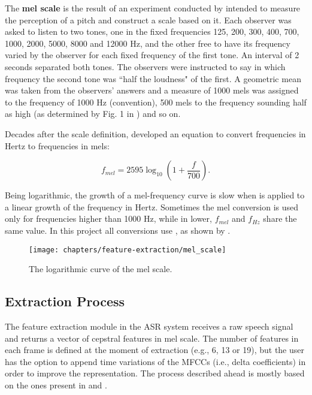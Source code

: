 The \textbf{mel scale} is the result of an experiment conducted by  intended to measure the perception of a pitch and construct a scale based on it. Each observer was asked to listen to two tones, one in the fixed frequencies 125, 200, 300, 400, 700, 1000, 2000, 5000, 8000 and 12000 Hz, and the other free to have its frequency varied by the observer for each fixed frequency of the first tone. An interval of 2 seconds separated both tones. The observers were instructed to say in which frequency the second tone was ``half the loudness" of the first. A geometric mean was taken from the observers' answers and a measure of 1000 mels was assigned to the frequency of 1000 Hz (convention), 500 mels to the frequency sounding half as high (as determined by Fig. 1 in ) and so on.

Decades after the scale definition,  developed an equation to convert frequencies in Hertz to frequencies in mels:

\begin{equation}
    f_{mel} = 2595 \log_{10}(1 + \frac{f}{700}).
    \label{eq:mel_conversion}
\end{equation}

\noindent Being logarithmic, the growth of a mel-frequency curve is slow when  is applied to a linear growth of the frequency in Hertz. Sometimes the mel conversion is used only for frequencies higher than 1000 Hz, while in lower, $f_{mel}$ and $f_{Hz}$ share the same value. In this project all conversions use , as shown by .

\begin{figure}[ht]
    \centering
    \texttt{[image: chapters/feature-extraction/mel\_scale]}
    \caption{The logarithmic curve of the mel scale.}
    \label{fig:mel_scale}
\end{figure}

\subsection{Extraction Process}

The feature extraction module in the ASR system receives a raw speech signal and returns a vector of cepstral features in mel scale. The number of features in each frame is defined at the moment of extraction (e.g., 6, 13 or 19), but the user has the option to append time variations of the MFCCs (i.e., delta coefficients) in order to improve the representation. The process described ahead is mostly based on the ones present in  and .

